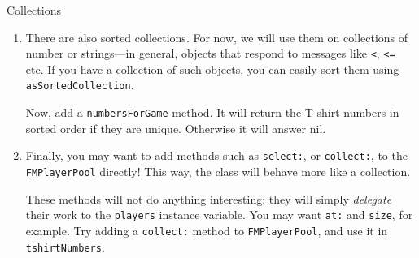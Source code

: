 \documentclass[a4paper,10pt]{scrartcl}
\begin{document}
\begin{exercise}{Collections}
\begin{enumerate}
\item There are also sorted collections.  For now, we will use them on
  collections of number or strings---in general, objects that respond to
  messages like \verb!<!, \verb!<=! etc.  If you have a collection of
  such objects, you can easily sort them using \verb!asSortedCollection!.


  Now, add a \verb!numbersForGame! method.  It will return the T-shirt
  numbers in sorted order if they are unique.  Otherwise it will answer nil.

\item Finally, you may want to add methods such as \verb!select:!, or
  \verb!collect:!, to the \verb!FMPlayerPool! directly!  This way, the
  class will behave more like a collection.

  These methods will not do anything interesting: they will simply
  \emph{delegate} their work to the \verb!players! instance variable.
  You may want \verb!at:! and \verb!size!, for example.
  Try adding a \verb!collect:! method to \verb!FMPlayerPool!, and
  use it in \verb!tshirtNumbers!.


\end{enumerate}
\end{exercise}
\end{document}
